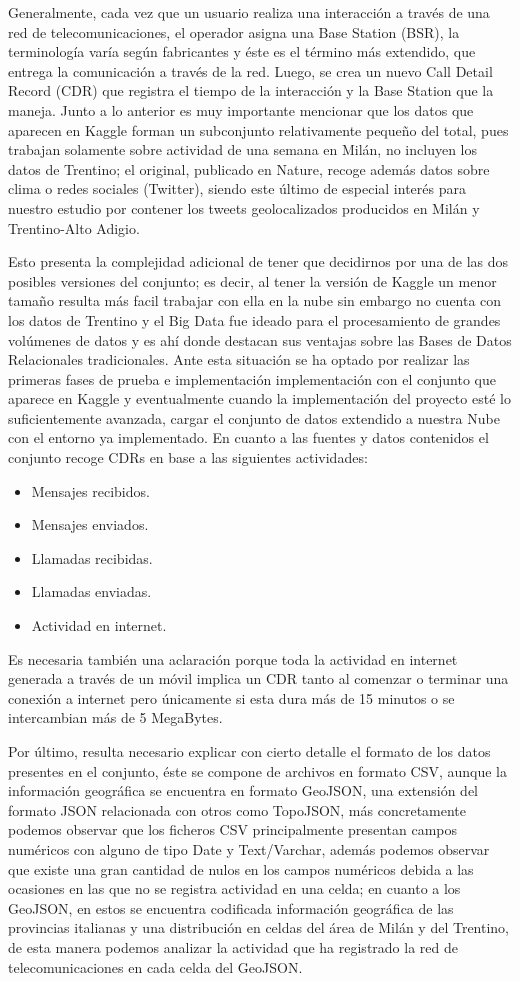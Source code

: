 \documentclass[11pt, a4paper]{article} %
\begin{document}
Generalmente, cada vez que un usuario realiza una interacción a través de una red de telecomunicaciones, el operador asigna una Base Station (BSR), la terminología varía según fabricantes y éste es el término más extendido, que entrega la comunicación a través de la red. Luego, se crea un nuevo Call Detail Record (CDR) que registra el tiempo de la interacción y la Base Station que la maneja. Junto a lo anterior es muy importante  mencionar que los datos que aparecen en Kaggle forman un subconjunto relativamente pequeño del total, pues trabajan solamente sobre actividad de una semana en Milán, no incluyen los datos de Trentino; el original, publicado en Nature, recoge además datos sobre clima o redes sociales (Twitter), siendo este último de especial interés para nuestro estudio por contener los tweets geolocalizados producidos en Milán y Trentino-Alto Adigio. 


Esto presenta la complejidad adicional de tener que decidirnos por una de las dos posibles versiones del conjunto; es decir, al tener la versión de Kaggle un menor tamaño resulta más facil trabajar con ella en la nube sin embargo no cuenta con los datos de Trentino y el Big Data fue ideado para el procesamiento de grandes volúmenes de datos y es ahí donde destacan sus ventajas sobre las Bases de Datos Relacionales tradicionales. Ante esta situación se ha optado por realizar las primeras fases de prueba e implementación implementación con el conjunto que aparece en Kaggle y eventualmente cuando la implementación del proyecto esté lo suficientemente avanzada, cargar el conjunto de datos extendido a nuestra Nube con el entorno ya implementado.
En cuanto a las fuentes y datos contenidos el conjunto recoge CDRs en base a las siguientes actividades:
\begin{itemize}
\item Mensajes recibidos.
\item Mensajes enviados.
\item Llamadas recibidas.
\item Llamadas enviadas.
\item Actividad en internet.
\end{itemize}
Es necesaria también una aclaración porque toda la actividad en internet generada a través de un móvil implica un CDR tanto al comenzar o terminar una conexión a internet pero únicamente si esta dura más de 15 minutos o se intercambian más de 5 MegaBytes. 


Por último, resulta necesario explicar con cierto detalle el formato de los datos presentes en el conjunto, éste se compone de archivos en formato CSV, aunque la información geográfica se encuentra en formato GeoJSON, una extensión del formato JSON relacionada con otros como TopoJSON, más concretamente podemos observar que los ficheros CSV principalmente presentan campos numéricos con alguno de tipo Date y Text/Varchar, además podemos observar que existe una gran cantidad de nulos en los campos numéricos debida a las ocasiones en las que no se registra actividad en una celda; en cuanto a los GeoJSON, en estos se encuentra codificada información geográfica de las provincias italianas y una distribución en celdas del área de Milán y del Trentino, de esta manera podemos analizar la actividad que ha registrado la red de telecomunicaciones en cada celda del GeoJSON.
\end{document}
